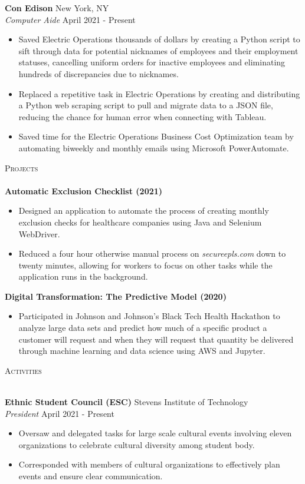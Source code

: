 \documentclass[10pt]{article}
\newcommand{\lineunder} {
    \vspace*{-8pt} \\
    \hspace*{-18pt} \hrulefill \\
}
\newcommand{\header} [1] {
    {\hspace*{-18pt}\vspace*{6pt} \textsc{#1}}
    \vspace*{-6pt} \lineunder
}
\begin{document}
\textbf{Con Edison} \hfill New York, NY\\
\textit{Computer Aide} \hfill April 2021 - Present\\
\vspace{-1mm}
\begin{itemize} \itemsep 1pt
    \item Saved Electric Operations thousands of dollars by creating a Python script to sift through data for potential nicknames of employees and their employment statuses, cancelling uniform orders for inactive employees and eliminating hundreds of discrepancies due to nicknames.
    \item Replaced a repetitive task in Electric Operations by creating and distributing a Python web scraping script to pull and migrate data to a JSON file, reducing the chance for human error when connecting with Tableau.
    \item Saved time for the Electric Operations Business Cost Optimization team by automating biweekly and monthly emails using Microsoft PowerAutomate.
\end{itemize}

\header{Projects}

{\textbf{Automatic Exclusion Checklist (2021)}}
\begin{itemize}
    \item Designed an application to automate the process of creating monthly exclusion checks for healthcare companies using Java and Selenium WebDriver.
    \item Reduced a four hour otherwise manual process on \textit{secureepls.com} down to twenty minutes, allowing for workers to focus on other tasks while the application runs in the background. 
\end{itemize}

{\textbf{Digital Transformation: The Predictive Model (2020)}}
\begin{itemize}
    \item Participated in Johnson and Johnson's Black Tech Health Hackathon to analyze large data sets and predict how much of a specific product a customer will request and when they will request that quantity be delivered through machine learning and data science using AWS and Jupyter.
\end{itemize}

\header{Activities}
\vspace{1mm}

\textbf{Ethnic Student Council (ESC)} \hfill Stevens Institute of Technology\\
\textit{President} \hfill April 2021 - Present\\
\vspace{-1mm}
\begin{itemize} \itemsep 1pt
    \item Oversaw and delegated tasks for large scale cultural events involving eleven organizations to celebrate cultural diversity among student body.
    \item Corresponded with members of cultural organizations to effectively plan events and ensure clear communication.
\end{itemize}
\end{document}
